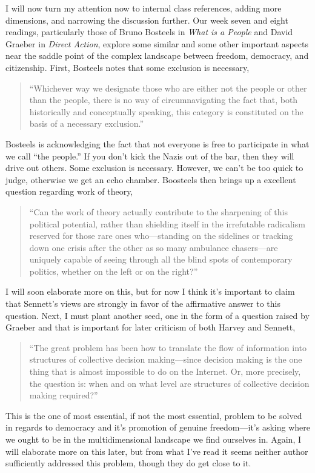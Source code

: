 \documentclass[12pt,a4paper]{article}
\begin{document}
I will now turn my attention now to internal class references, adding more dimensions, and narrowing the discussion further. Our week seven and eight readings, particularly those of Bruno Bosteels in \textit{What is a People} and David Graeber in \textit{Direct Action}, explore some similar and some other important aspects near the saddle point of the complex landscape between freedom, democracy, and citizenship. First, Bosteels notes that some exclusion is necessary, 
\begin{quote}\color{G-Moon}
   ``Whichever way we designate those who are either not the people or other than the people, there is no way of circumnavigating the fact that, both historically and conceptually speaking, this category is constituted on the basis of a necessary exclusion.''~\cite{people}
\end{quote}
Bosteels is acknowledging the fact that not everyone is free to participate in what we call ``the people.'' If you don't kick the Nazis out of the bar, then they will drive out others. Some exclusion is necessary. However, we can't be too quick to judge, otherwise we get an echo chamber. Boosteels then brings up a excellent question regarding work of theory, 
\begin{quote}\color{G-Moon}
   ``Can the work of theory actually contribute to the sharpening of this political potential, rather than shielding itself in the irrefutable radicalism reserved for those rare ones who—standing on the sidelines or tracking down one crisis after the other as so many ambulance chasers—are uniquely capable of seeing through all the blind spots of contemporary politics, whether on the left or on the right?''~\cite{people}
\end{quote}
I will soon elaborate more on this, but for now I think it's important to claim that Sennett's views are strongly in favor of the affirmative answer to this question. Next, I must plant another seed, one in the form of a question raised by Graeber and that is important for later criticism of both Harvey and Sennett,
\begin{quote}\color{G-Moon}
   ``The great problem has been how to translate the flow of information into structures of collective decision making—since decision making is the one thing that is almost impossible to do on the Internet. Or, more precisely, the question is: when and on what level are structures of collective decision making required?''~\cite{direct}
\end{quote}
This is the one of most essential, if not the most essential, problem to be solved in regards to democracy and it's promotion of genuine freedom---it's asking where we ought to be in the multidimensional landscape we find ourselves in. Again, I will elaborate more on this later, but from what I've read it seems neither author sufficiently addressed this problem, though they do get close to it. 
\end{document}
